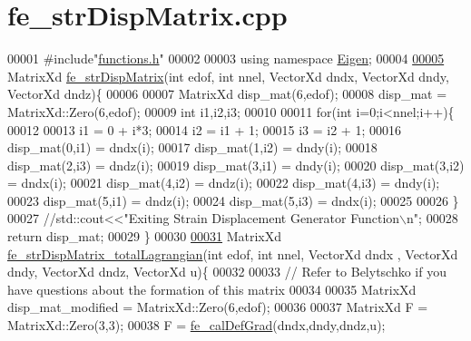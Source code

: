 \hypertarget{fe__str_disp_matrix_8cpp_source}{}\section{fe\+\_\+str\+Disp\+Matrix.\+cpp}
\label{fe__str_disp_matrix_8cpp_source}

\begin{DoxyCode}
00001 \textcolor{preprocessor}{#include"\hyperlink{functions_8h}{functions.h}"}
00002 
00003 \textcolor{keyword}{using namespace }\hyperlink{namespace_eigen}{Eigen};
00004 
\hyperlink{fe__str_disp_matrix_8cpp_a4b49d2df4f86e7d0755971ab4bfa48b2}{00005} MatrixXd \hyperlink{fe__str_disp_matrix_8cpp_a4b49d2df4f86e7d0755971ab4bfa48b2}{fe\_strDispMatrix}(\textcolor{keywordtype}{int} edof, \textcolor{keywordtype}{int} nnel, VectorXd dndx, VectorXd dndy, VectorXd dndz)\{
00006     
00007     MatrixXd disp\_mat(6,edof);
00008     disp\_mat = MatrixXd::Zero(6,edof);
00009     \textcolor{keywordtype}{int} i1,i2,i3;
00010 
00011     \textcolor{keywordflow}{for}(\textcolor{keywordtype}{int} i=0;i<nnel;i++)\{
00012 
00013         i1 = 0 + i*3;
00014         i2 = i1 + 1;
00015         i3 = i2 + 1;
00016         disp\_mat(0,i1) = dndx(i);
00017         disp\_mat(1,i2) = dndy(i);
00018         disp\_mat(2,i3) = dndz(i);
00019         disp\_mat(3,i1) = dndy(i);
00020         disp\_mat(3,i2) = dndx(i);
00021         disp\_mat(4,i2) = dndz(i);
00022         disp\_mat(4,i3) = dndy(i);
00023         disp\_mat(5,i1) = dndz(i);
00024         disp\_mat(5,i3) = dndx(i);   
00025 
00026     \}
00027     \textcolor{comment}{//std::cout<<"Exiting Strain Displacement Generator Function\(\backslash\)n";}
00028     \textcolor{keywordflow}{return} disp\_mat;
00029 \}
00030 
\hyperlink{fe__str_disp_matrix_8cpp_a8c9fd519c93c847cdf52de947964eb67}{00031} MatrixXd \hyperlink{fe__str_disp_matrix_8cpp_a8c9fd519c93c847cdf52de947964eb67}{fe\_strDispMatrix\_totalLagrangian}(\textcolor{keywordtype}{int} edof, \textcolor{keywordtype}{int} nnel, VectorXd dndx
      , VectorXd dndy, VectorXd dndz, VectorXd u)\{
00032 
00033     \textcolor{comment}{// Refer to Belytschko if you have questions about the formation of this matrix}
00034 
00035     MatrixXd disp\_mat\_modified = MatrixXd::Zero(6,edof);
00036 
00037     MatrixXd F = MatrixXd::Zero(3,3);
00038     F = \hyperlink{functions_8h_ae50379f74802347e04dbc022897f9cb0}{fe\_calDefGrad}(dndx,dndy,dndz,u);

\end{DoxyCode}
